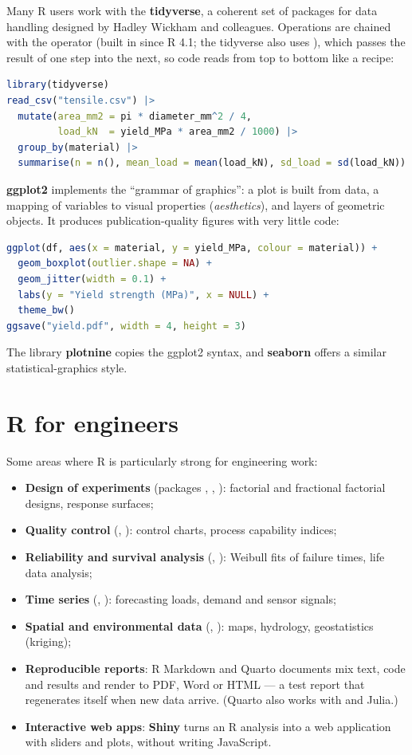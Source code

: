 Many R users work with the \textbf{tidyverse}, a coherent set of packages for data
handling designed by Hadley Wickham and colleagues. Operations are chained with the
 operator \code{|>} (built in since R 4.1; the tidyverse also uses
\code{\%>\%}), which passes the result of one step into the next, so code reads from top to
bottom like a recipe:
\begin{lstlisting}[language=R]
library(tidyverse)
read_csv("tensile.csv") |>
  mutate(area_mm2 = pi * diameter_mm^2 / 4,
         load_kN  = yield_MPa * area_mm2 / 1000) |>
  group_by(material) |>
  summarise(n = n(), mean_load = mean(load_kN), sd_load = sd(load_kN))
\end{lstlisting}
\textbf{ggplot2} implements the ``grammar of graphics'': a plot is built from data, a
mapping of variables to visual properties (\emph{aesthetics}), and layers of geometric
objects. It produces publication-quality figures with very little code:
\begin{lstlisting}[language=R]
ggplot(df, aes(x = material, y = yield_MPa, colour = material)) +
  geom_boxplot(outlier.shape = NA) +
  geom_jitter(width = 0.1) +
  labs(y = "Yield strength (MPa)", x = NULL) +
  theme_bw()
ggsave("yield.pdf", width = 4, height = 3)
\end{lstlisting}
The \py library \textbf{plotnine} copies the ggplot2 syntax, and \textbf{seaborn} offers a
similar statistical-graphics style.

\section{R for engineers}

Some areas where R is particularly strong for engineering work:
\begin{itemize}
\item \textbf{Design of experiments} (packages , , ):
  factorial and fractional factorial designs, response surfaces;
\item \textbf{Quality control} (, ): control charts, process
  capability indices;
\item \textbf{Reliability and survival analysis} (, ): Weibull
  fits of failure times, life data analysis;
\item \textbf{Time series} (, ): forecasting loads, demand and
  sensor signals;
\item \textbf{Spatial and environmental data} (, ): maps, hydrology,
  geostatistics (kriging);
\item \textbf{Reproducible reports}: R Markdown and Quarto documents mix text, code and
  results and render to PDF, Word or HTML --- a test report that regenerates itself when
  new data arrive. (Quarto also works with \py and Julia.)
\item \textbf{Interactive web apps}: \textbf{Shiny} turns an R analysis into a web
  application with sliders and plots, without writing JavaScript.
\end{itemize}

